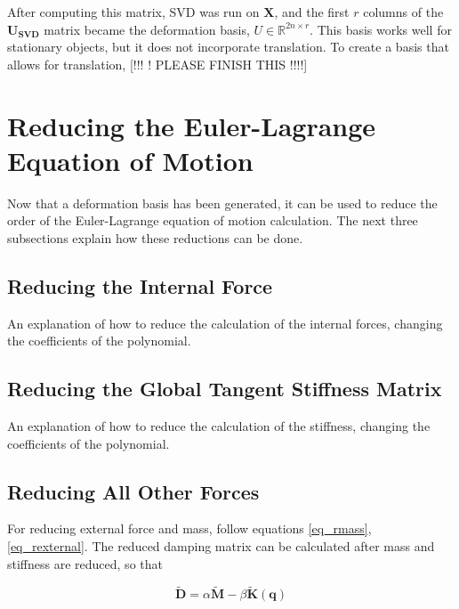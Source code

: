 \documentclass[twocolumn,10pt]{asme2ej}
\begin{document}
After computing this matrix, SVD was run on $\bm{X}$, and the first $r$ columns of the $\bm{U_{SVD}}$ matrix became the deformation basis, $U \in \mathbb{R}^{2n \times r}$. This basis works well for stationary objects, but it does not incorporate translation. To create a basis that allows for translation, [!!! ! PLEASE FINISH THIS !!!!]

\section{Reducing the Euler-Lagrange Equation of Motion}

Now that a deformation basis has been generated, it can be used to reduce the order of the Euler-Lagrange equation of motion calculation. The next three subsections explain how these reductions can be done.

\subsection{Reducing the Internal Force}

An explanation of how to reduce the calculation of the internal forces, changing the coefficients
of the polynomial.

\subsection{Reducing the Global Tangent Stiffness Matrix}

An explanation of how to reduce the calculation of the stiffness, changing the coefficients
of the polynomial.

\subsection{Reducing All Other Forces}

For reducing external force and mass, follow equations \ref{eq_rmass}, \ref{eq_rexternal}. The reduced damping matrix can be calculated after mass and stiffness are reduced, so that

\begin{equation}
  \bm{\tilde{D}} = \alpha\bm{\tilde{M}} - \beta\bm{\tilde{K}}(\bm{q})
\end{equation}
\end{document}
